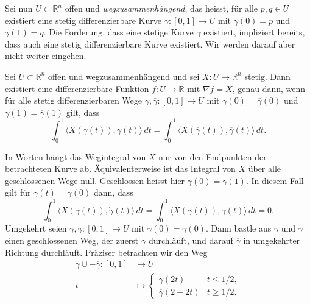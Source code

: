 \documentclass[../main.tex]{subfiles}
\begin{document}
Sei nun $U \subset \mathbb{R}^n$ offen und
\emph{wegzusammenhängend}, das heisst, für
alle $p , q \in U$ existiert eine stetig
differenzierbare
Kurve $\gamma \colon [0, 1] \to U$ mit $\gamma(0) = p$
und $\gamma(1) = q$.
Die Forderung, dass eine stetige Kurve $\gamma$
existiert, impliziert bereits, dass auch eine stetig
differenzierbare Kurve existiert. Wir werden darauf
aber nicht weiter eingehen.

\begin{proposition}\label{prop:gradient-fields-curves}
  Sei $U \subset \mathbb{R}^n$ offen
  und wegzusammenhängend und
  sei $X \colon U \to \mathbb{R}^n$ stetig.
  Dann existiert eine differenzierbare Funktion
  $f \colon U \to \mathbb{R}$ mit $\nabla f = X$,
  genau dann, wenn für alle stetig differenzierbaren
  Wege $\gamma, \overline \gamma \colon [0, 1] \to U$ 
  mit $\gamma(0) = \overline \gamma ( 0) $ und
  $\gamma(1) = \overline\gamma(1)$ gilt, dass
  \[
    \int_{0}^{1} \langle X(\gamma(t)), \dot \gamma(t) \rangle \, dt
    =
    \int_{0}^{1} \langle X(\overline\gamma(t)), 
    \dot{\overline\gamma}(t) \rangle \, dt.
  \]
\end{proposition}

In Worten hängt das Wegintegral von $X$ nur von den Endpunkten
der betrachteten Kurve ab. Äquivalenterweise ist das Integral
von $X$ über alle geschlossenen Wege null.
Geschlossen heisst hier $\gamma(0) = \gamma(1)$.
In diesem Fall gilt für $\overline \gamma(t) = \gamma(0)$ 
dann, dass
\[
  \int_{0}^{1} \langle X(\gamma(t)), \dot \gamma(t) \rangle \, dt
  =
  \int_{0}^{1} \langle X(\overline\gamma(t)), 
  \dot{\overline\gamma}(t) \rangle \, dt = 0.
\]
Umgekehrt seien $\gamma, \overline \gamma \colon [0, 1] \to U$ 
mit $\gamma(0) = \overline \gamma(0)$.
Dann bastle aus $\gamma$ und $\overline \gamma$ 
einen geschlossenen Weg, der zuerst
$\gamma$ durchläuft, und darauf $\overline \gamma$ in umgekehrter
Richtung durchläuft.
Präziser betrachten wir den Weg
\begin{align*}
  \gamma \cup - \overline \gamma \colon [0, 1] & \to U \\
  t & \mapsto 
  \begin{cases}
    \gamma(2t) & t \leq 1/2,\\
    \overline \gamma (2 - 2t) & t \geq 1/2.
  \end{cases}
\end{align*}
\end{document}
